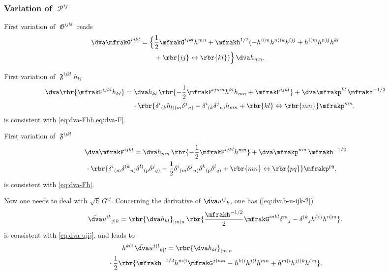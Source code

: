 \documentclass[a4paper,11pt]{article}
\begin{document}
\subsubsection{Variation of \texorpdfstring{$\mscrP^{ij}$}{$P^{ij}$}}


First variation of $\mfrakG^{ijkl}$ reads
\begin{align}
\dva \mfrakG^{ijkl} &= \Big\{\frac{1}{2}\mfrakG^{ijkl}h^{mn}
+ \mfrakh^{1/2}(-h^{i(m}h^{n)(k}h^{l)j} + h^{i(m}h^{n)j}h^{kl}
\nonumber \\
&\qquad+
\rbr{ij} \leftrightarrow \rbr{kl} ) \Big\} \,\dva h_{mn}.
\end{align}

First variation of $\mfrakF^{ijkl}h_{kl}$
\begin{align}
\dva\rbr{\mfrakF^{ijkl}h_{kl}} &= \dva h_{kl}\,
\rbr{-\frac{1}{2}\mfrakF^{ijmn}h^{kl}h_{mn}+\mfrakF^{ijkl}}
+
\dva \mfrakp^{kl} \, \mfrakh^{-1/2}
\nonumber \\
&\quad\,\cdot
\rbr{\delta^{i}{}_{(k}h_{l)(m}\delta^{j}{}_{n)}-
\delta^{i}{}_{(k}\delta^{j}{}_{n)}h_{mn} 
+ \rbr{kl}\leftrightarrow\rbr{mn}}
\mfrakp^{mn}.
\label{eq:dva-Fh}
\end{align}
 is consistent with \cref{eq:dva-Fhh,eq:dva-F}.

First variation of $\mfrakF^{ijkl}$
\begin{align}
&\dva\mfrakF^{ijkl} = \dva h_{mn}\,\rbr{-\frac{1}{2}\mfrakF^{ijkl}h^{mn}}
+\dva\mfrakp^{mn}\,\mfrakh^{-1/2}
\nonumber \\
&\,\cdot \rbr{
\delta^{i}{}_{(m} \delta^{(k}{}_{n)} \delta^{l)}{}_{(p} \delta^{j}{}_{q)} -
\frac{1}{2}
\delta^{i}{}_{(m} \delta^{j}{}_{n)} \delta^{k}{}_{(p} \delta^{l}{}_{q)}
+\rbr{mn}\leftrightarrow\rbr{pq}}\mfrakp^{pq}.
\label{eq:dva-F}
\end{align}
 is consistent with \cref{eq:dva-Fh}.

Now one needs to deal with $\sqrt{\mfrakh}\,G^{ij}$. Concerning the derivative 
of $\bar{\dva}u^{ij}{}_k$, one has (\cref{eq:dvab-u-ijk-2})
\begin{align}
\bar{\dva}u^{ik}{}_{j|k} =
\rbr{\dva h_{kl}}_{|m|n}\,
\rbr{\frac{\mfrakh^{-1/2}}{2} \mfrakG^{inkl} \delta^m{}_j
- \delta^{(k}{}_{j}h^{l)[i}h^{n]m}}.
\label{eq:dva-uikj|k}
\end{align}
 is consistent with \cref{eq:dva-ujij}, and leads to
\begin{align}
&\qquad
h^{k(i}\,\bar{\dva}u^{j)l}{}_{k|l} =
\rbr{\dva h_{kl}}_{|m|n}
\nonumber \\
&\cdot
\frac{1}{2}\rbr{ \mfrakh^{-1/2} h^{m(i}\mfrakG^{j)nkl}
- h^{k(i}h^{j)l}h^{mn} + h^{m(i}h^{j)(k}h^{l)n}}.
\label{eq:hki-dva-ujlk|l}
\end{align}
\end{document}
